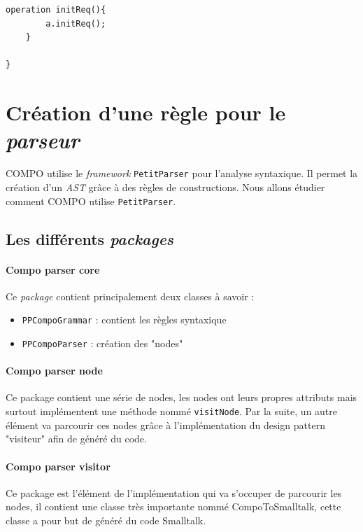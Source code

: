 \documentclass[11pt,a4paper,openany,oneside]{book}
\begin{document}
\begin{appendices}
\begin{lstlisting}[language=Compo, frame=single, caption=Programme]
	operation initReq(){
	    a.initReq();
	}
	
}
\end{lstlisting}





\chapter{Création d'une règle pour le \textit{parseur}}

COMPO utilise le \textit{framework} \texttt{PetitParser} pour l'analyse syntaxique. Il permet la création d'un \textit{AST} grâce à des règles de constructions. Nous allons étudier comment COMPO utilise \texttt{PetitParser}.

\section*{Les différents \textit{packages}}

\subsubsection{Compo parser core}
Ce \textit{package} contient principalement deux classes à savoir :

\begin{itemize}
\item \texttt{PPCompoGrammar} : contient les règles syntaxique
\item \texttt{PPCompoParser} : création des "nodes"
\end{itemize}
	
\subsubsection{Compo parser node}
Ce package contient une série de nodes, les nodes ont leurs propres attributs mais surtout implémentent une méthode nommé \texttt{visitNode}.
Par la suite, un autre élément va parcourir ces nodes grâce à l'implémentation du design pattern "visiteur" afin de généré du code.

\subsubsection{Compo parser visitor}
Ce package est l'élément de l'implémentation qui va s'occuper de parcourir les nodes, il contient une classe très importante nommé
CompoToSmalltalk, cette classe a pour but de généré du code Smalltalk.


\end{appendices}
\end{document}
